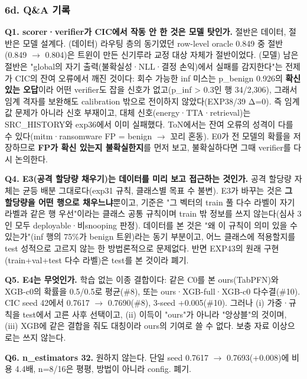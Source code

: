 \subsubsection{6d. Q\&A 기록}
\textbf{Q1. scorer·verifier가 CIC에서 작동 안 한 것은 모델 탓인가.} 절반은 데이터, 절반은 모델 설계다. (데이터) 라우팅 층의 동기였던 row-level oracle 0.849 중 절반(0.849 \ensuremath{\rightarrow} 0.804)은 트윈이 만든 신기루라 교정 대상 자체가 절반이었다. (모델) 남은 절반은 "global의 자기 출력(불확실성·NLL·결정 손익)에서 실패를 감지한다"는 전제가 CIC의 잔여 오류에서 깨진 것이다: 회수 가능한 inf 미스는 p\_\allowbreak{}benign 0.926의 \textbf{확신 있는 오답}이라 어떤 verifier도 잡을 신호가 없고(p\_\allowbreak{}inf > 0.3인 행 34/\allowbreak{}2,306), 그래서 임계 격자를 보완해도 calibration 밖으로 전이하지 않았다(EXP38/\allowbreak{}39 Δ=\allowbreak{}0). 즉 임계값 문제가 아니라 신호 부재이고, 대체 신호(energy·TTA·retrieval)는 SRC\_\allowbreak{}HISTORY와 exp36에서 이미 실패했다. ToN에서는 잔여 오류의 성격이 다를 수 있다(mitm·ransomware FP =\allowbreak{} benign \ensuremath{\rightarrow} 꼬리 혼동). E0가 전 모델의 확률을 저장하므로 \textbf{FP가 확신 있는지 불확실한지}를 먼저 보고, 불확실하다면 그때 verifier를 다시 논의한다.

\textbf{Q4. E3(공격 할당량 채우기)는 데이터를 미리 보고 접근하는 것인가.} 공격 할당량 자체는 균등 배분 그대로다(exp31 규칙, 클래스별 목표 수 불변). E3가 바꾸는 것은 \textbf{그 할당량을 어떤 행으로 채우느냐}뿐이고, 기준은 "그 벡터의 train 풀 다수 라벨이 자기 라벨과 같은 행 우선"이라는 클래스 공통 규칙이며 train 밖 정보를 쓰지 않는다(심사 3인 모두 deployable·비snooping 판정). 데이터를 본 것은 "왜 이 규칙이 의미 있을 수 있는가"(inf 행의 75\%가 benign 트윈)라는 동기 부분이고, 어느 클래스에 적용할지를 test 성적으로 고르지 않는 한 방법론적으로 문제없다. 반면 EXP43의 원래 구현(train+\allowbreak{}val+\allowbreak{}test 다수 라벨)은 test를 본 것이라 폐기.

\textbf{Q5. E4는 무엇인가.} 학습 없는 이종 결합이다: 같은 C0를 본 ours(TabPFN)와 XGB-c0의 확률을 0.5/\allowbreak{}0.5로 평균(\#8), 또는 ours·XGB-full·XGB-c0 다수결(\#10). CIC seed 42에서 0.7617 \ensuremath{\rightarrow} 0.7690(\#8), 3-seed +\allowbreak{}0.005(\#10). 그러나 (i) 가중·규칙을 test에서 고른 사후 선택이고, (ii) 이득이 "ours"가 아니라 "앙상블"의 것이며, (iii) XGB에 같은 결합을 줘도 대칭이라 ours의 기여로 쓸 수 없다. 보충 자료 이상으로는 쓰지 않는다.

\textbf{Q6. n\_\allowbreak{}estimators 32.} 원하지 않는다. 단일 seed 0.7617 \ensuremath{\rightarrow} 0.7693(+\allowbreak{}0.008)에 비용 4.4배, n=\allowbreak{}8/\allowbreak{}16은 평평, 방법이 아니라 config. 폐기.

